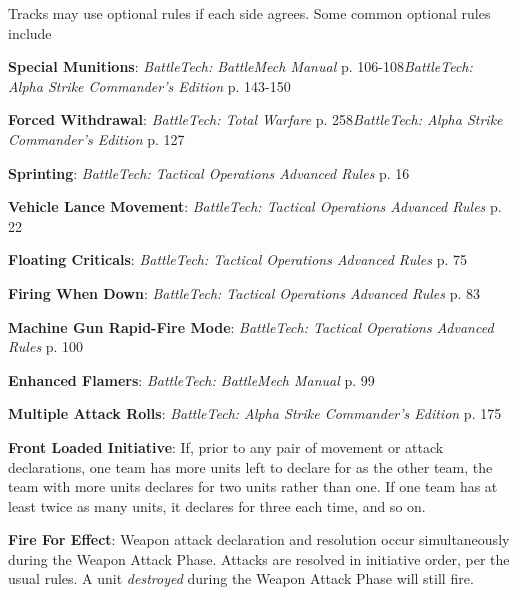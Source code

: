 Tracks may use optional rules if each side agrees.
Some common optional rules include

\begin{description}

  \item {\bfseries Special Munitions}: \emph{BattleTech: BattleMech Manual} p. 106-108\emph{BattleTech: Alpha Strike Commander's Edition} p. 143-150

  \item {\bfseries Forced Withdrawal}: \emph{BattleTech: Total Warfare} p. 258\emph{BattleTech: Alpha Strike Commander's Edition} p. 127

  \item {\bfseries Sprinting}: \emph{BattleTech: Tactical Operations Advanced Rules} p. 16

  \item {\bfseries Vehicle Lance Movement}: \emph{BattleTech: Tactical Operations Advanced Rules} p. 22

  \item {\bfseries Floating Criticals}: \emph{BattleTech: Tactical Operations Advanced Rules} p. 75

  \item {\bfseries Firing When Down}: \emph{BattleTech: Tactical Operations Advanced Rules} p. 83

  \item {\bfseries Machine Gun Rapid-Fire Mode}: \emph{BattleTech: Tactical Operations Advanced Rules} p. 100

  \item {\bfseries Enhanced Flamers}: \emph{BattleTech: BattleMech Manual} p. 99

  \item {\bfseries Multiple Attack Rolls}: \emph{BattleTech: Alpha Strike Commander's Edition} p. 175

  \item {\bfseries Front Loaded Initiative}: If, prior to any pair of movement or attack declarations, one team has more units left to declare for as the other team, the team with more units declares for two units rather than one.
If one team has at least twice as many units, it declares for three each time, and so on.

  \item {\bfseries Fire For Effect}: Weapon attack declaration and resolution occur simultaneously during the Weapon Attack Phase.
        Attacks are resolved in initiative order, per the usual rules.
        A unit \emph{destroyed} during the Weapon Attack Phase will still fire.

\end{description}
